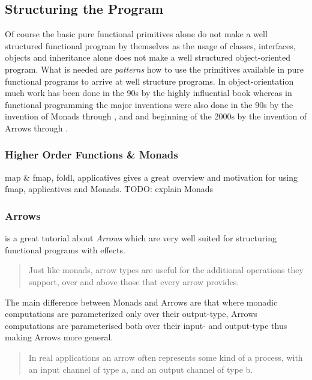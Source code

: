 \subsection{Structuring the Program}
Of course the basic pure functional primitives alone do not make a well structured functional program by themselves as the usage of classes, interfaces, objects and inheritance alone does not make a well structured object-oriented program. What is needed are \textit{patterns} how to use the primitives available in pure functional programs to arrive at well structure programs. In object-orientation much work has been done in the 90s by the highly influential book \cite{gamma_design_1994} whereas in functional programming the major inventions were also done in the 90s by the invention of Monads through \cite{Moggi1989}, \cite{Wadler1990} and \cite{Wadler1995} and beginning of the 2000s by the invention of Arrows through \cite{Hughes2000}.

\subsubsection{Higher Order Functions \& Monads}
map \& fmap, foldl, applicatives
\cite{hutton_programming_2007} gives a great overview and motivation for using fmap, applicatives and Monads. TODO: explain Monads

\subsubsection{Arrows}
\cite{Hughes2004} is a great tutorial about \textit{Arrows} which are very well suited for structuring functional programs with effects.

\begin{quote}
Just like monads, arrow types are useful for the additional operations they support, over and above those that every arrow provides.
\end{quote}

The main difference between Monads and Arrows are that where monadic computations are parameterized only over their output-type, Arrows computations are parameterised both over their input- and output-type thus making Arrows more general.

\begin{quote}
In real applications an arrow often represents some kind of a process, with an input channel of type a, and an output channel of type b.
\end{quote}

